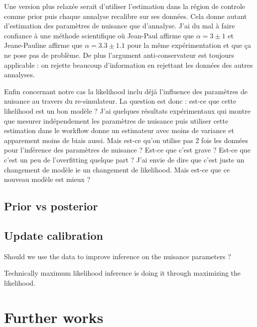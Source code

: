 Une version plus relaxée serait d'utiliser l'estimation dans la région de controle comme prior puis chaque annalyse recalibre sur ses données.
Cela donne autant d'estimation des paramètres de nuisance que d'annalyse.
J'ai du mal à faire confiance à une méthode scientifique où Jean-Paul affirme que $\alpha = 3 \pm 1$ et Jeane-Pauline affirme que $\alpha = 3.3 \pm 1.1$ pour la même expérimentation et que ça ne pose pas de problème.
De plus l'argument anti-conservateur est toujours applicable : on rejette beaucoup d'information en rejettant les données des autres annalyses.

Enfin concernant notre cas la likelihood inclu déjà l'influence des paramètres de nuisance au travers du re-simulateur.
La question est donc : est-ce que cette likelihood est un bon modèle ?
J'ai quelques résultats expérimentaux qui montre que mesurer indépendement les paramètres de nuisance puis utiliser cette estimation dans le workflow donne un estimateur avec moins de variance et apparement moins de biais aussi.
Mais est-ce qu'on utilise pas 2 fois les données pour l'inférence des paramètres de nuisance ?
Est-ce que c'est grave ? Est-ce que c'est un peu de l'overfitting quelque part ?
J'ai envie de dire que c'est juste un changement de modèle ie un changement de likelihood.
Mais est-ce que ce nouveau modèle est mieux ?




\subsection{Prior vs posterior} %
\label{sub:prior_vs_posterior}






\subsection{Update calibration} %
\label{sub:update_calibration}

Should we use the data to improve inference on the nuisance parameters ?

Technically maximum likelihood inference is doing it through maximizing the likelihood.


\section{Further works} %
\label{sec:further_works}

